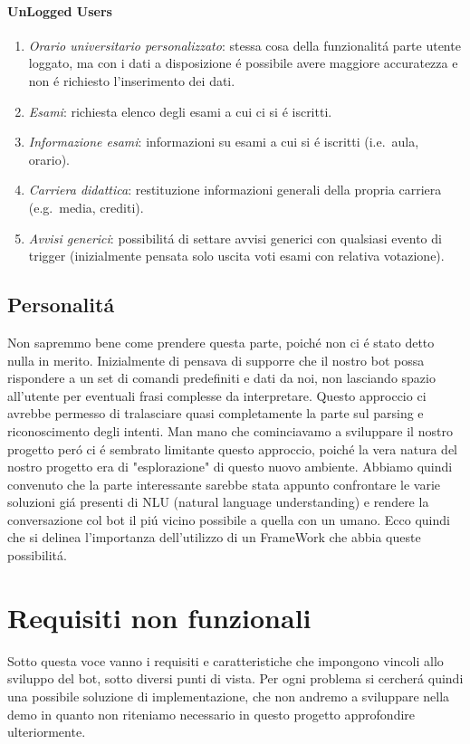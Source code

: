 \documentclass[]{article}
\begin{document}
\paragraph{UnLogged Users}
\begin{enumerate}
\item \textit{Orario universitario personalizzato}: stessa cosa della funzionalitá parte utente loggato, ma con i dati a disposizione é possibile avere maggiore accuratezza e non é richiesto l'inserimento dei dati.
\item \textit{Esami}: richiesta elenco degli esami a cui ci si é iscritti.
\item \textit{Informazione esami}: informazioni su esami a cui si é iscritti (i.e.\ aula, orario).
\item \textit{Carriera didattica}: restituzione informazioni generali della propria carriera (e.g.\ media, crediti).
\item \textit{Avvisi generici}: possibilitá di settare avvisi generici con qualsiasi evento di trigger (inizialmente pensata solo uscita voti esami con relativa votazione).
\end{enumerate}

\subsection{Personalitá}
Non sapremmo bene come prendere questa parte, poiché non ci é stato detto nulla in merito. Inizialmente di pensava di supporre che il nostro bot possa rispondere a un set di comandi predefiniti e dati da noi, non lasciando spazio all’utente per eventuali frasi complesse da interpretare. Questo approccio ci avrebbe permesso di tralasciare quasi completamente la parte sul parsing e riconoscimento degli intenti. Man mano che cominciavamo a sviluppare il nostro progetto peró ci é sembrato limitante questo approccio, poiché la vera natura del nostro progetto era di "esplorazione" di questo nuovo ambiente. Abbiamo quindi convenuto che la parte interessante sarebbe stata appunto confrontare le varie soluzioni giá presenti di NLU (natural language understanding) e rendere la conversazione col bot il piú vicino possibile a quella con un umano. Ecco quindi che si delinea l'importanza dell'utilizzo di un FrameWork che abbia queste possibilitá.

\section{Requisiti non funzionali}
Sotto questa voce vanno i requisiti e caratteristiche che impongono vincoli  allo sviluppo del bot, sotto diversi punti di vista. Per ogni problema si cercherá quindi una possibile soluzione di implementazione, che non andremo a sviluppare nella demo in quanto non riteniamo necessario in questo progetto approfondire ulteriormente.
\end{document}
